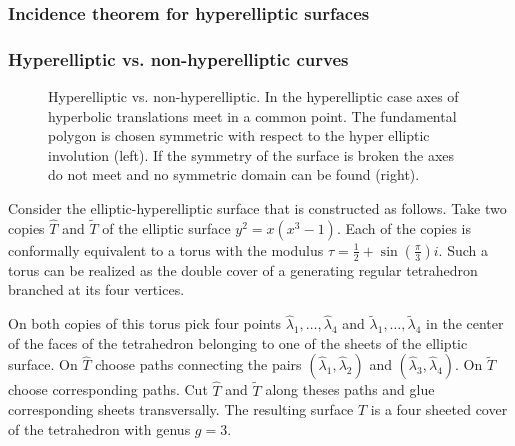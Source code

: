 \documentclass[Thesis.tex]{subfiles}
\begin{document}

  \subsubsection{Incidence theorem for hyperelliptic surfaces}

  \subsubsection{Hyperelliptic vs. non-hyperelliptic curves}
  \label{sec:non-hyperelliptic}

  \begin{figure}
  \centering
  \caption{Hyperelliptic vs. non-hyperelliptic. In the hyperelliptic case axes of hyperbolic translations meet in a common point. The fundamental polygon is chosen symmetric with respect to the hyper elliptic involution (left). If the symmetry of the surface is broken the axes do not meet and no symmetric domain can be found (right).}
  \label{fig:non-hyperelliptic}
  \end{figure}

  Consider the elliptic-hyperelliptic surface that is constructed as follows. Take two copies $\hat T$ and $\tilde T$ of the elliptic surface $y^2=x(x^3 - 1)$. Each of the copies is conformally equivalent to a torus with the modulus $\tau=\frac{1}{2}+\sin(\frac{\pi}{3})i$. Such a torus can be realized as the double cover of a generating regular tetrahedron branched at its four vertices.

  On both copies of this torus pick four points $\hat\lambda_1,\ldots,\hat\lambda_4$ and $\tilde\lambda_1,\ldots,\tilde\lambda_4$ in the center of the faces of the tetrahedron belonging to one of the sheets of the elliptic surface. On $\hat T$ choose paths connecting the pairs $(\hat\lambda_1,\hat\lambda_2)$ and $(\hat\lambda_3,\hat\lambda_4)$. On $\tilde T$ choose corresponding paths. Cut $\hat T$ and $\tilde T$ along theses paths and glue corresponding sheets transversally. The resulting surface $T$ is a four sheeted cover of the tetrahedron with genus $g = 3$.
\end{document}
